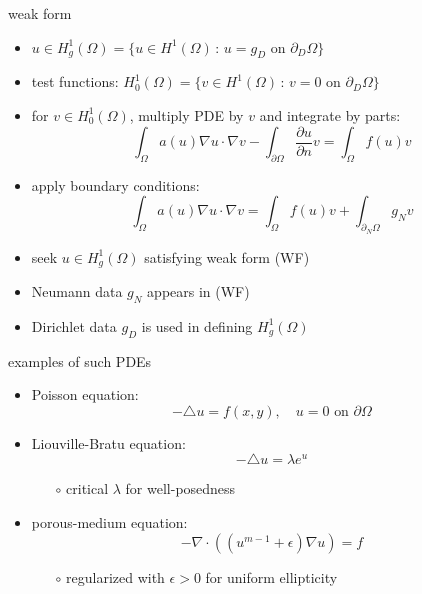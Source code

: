 \documentclass[hide notes,intlimits,usenames,dvipsnames]{beamer}
\newcommand{\Div}{\nabla\cdot}
\newcommand{\eps}{\epsilon}
\newcommand{\grad}{\nabla}
\begin{document}
\begin{frame}{weak form}
\begin{itemize}
\item $u\in H_g^1(\Omega) = \{u\in H^1(\Omega)\,:\,u=g_D \text{ on } \partial_D\Omega\}$
\item test functions: $H_0^1(\Omega) = \{v\in H^1(\Omega)\,:\,v=0 \text{ on } \partial_D\Omega\}$
\item for $v\in H^1_0(\Omega)$, multiply PDE by $v$ and integrate by parts:
\begin{equation*}
\int_\Omega a(u) \grad u \cdot \grad v - \int_{\partial\Omega} \frac{\partial u}{\partial n} v = \int_\Omega f(u) v
\end{equation*}
\item apply boundary conditions:
\begin{equation*}
\int_\Omega a(u) \grad u \cdot \grad v = \int_\Omega f(u) v + \int_{\partial_N\Omega} g_N v \tag{WF}
\end{equation*}
\item seek $u \in H^1_g(\Omega)$ satisfying weak form (WF)
\item Neumann data $g_N$ appears in (WF)
\item Dirichlet data $g_D$ is used in defining $H^1_g(\Omega)$
\end{itemize}
\end{frame}

\begin{frame}{examples of such PDEs}
\begin{itemize}
\item Poisson equation:
    $$-\triangle u=f(x,y), \quad u=0 \text{ on } \partial \Omega$$
\item Liouville-Bratu equation:
    $$-\triangle u = \lambda e^u$$

\vspace{-3mm}
    \begin{itemize}
    \item[$\circ$] critical $\lambda$ for well-posedness
    \end{itemize}
\item porous-medium equation:
    $$-\Div\left((u^{m-1} + \eps)\grad u\right) = f$$

\vspace{-3mm}
    \begin{itemize}
    \item[$\circ$] regularized with $\eps>0$ for uniform ellipticity
    \end{itemize}
\end{itemize}
\end{frame}
\end{document}
